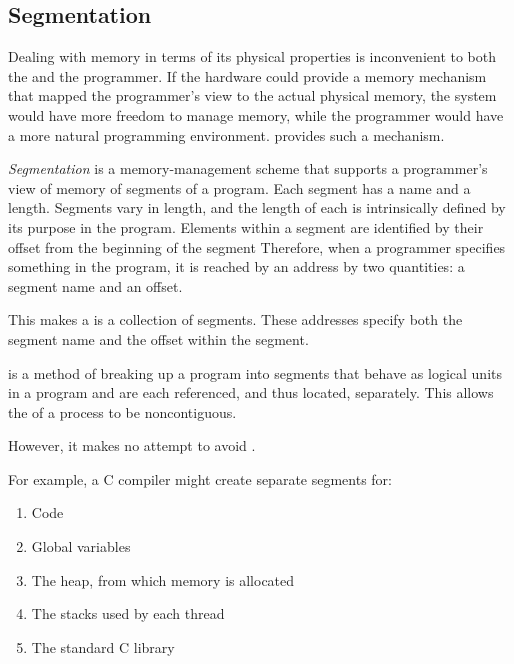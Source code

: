 \subsection{Segmentation}\label{subsec:Segmentation}
Dealing with memory in terms of its physical properties is inconvenient to both the  and the programmer.
If the hardware could provide a memory mechanism that mapped the programmer’s view to the actual physical memory, the system would have more freedom to manage memory, while the programmer would have a more natural programming environment.
 provides such a mechanism.

\begin{definition}[Segmentation]\label{def:Segmentation}
  \emph{Segmentation} is a memory-management scheme that supports a programmer's view of memory of segments of a program.
  Each segment has a name and a length.
  Segments vary in length, and the length of each is intrinsically defined by its purpose in the program.
  Elements within a segment are identified by their offset from the beginning of the segment
  Therefore, when a programmer specifies something in the program, it is reached by an address by two quantities: a segment name and an offset.

  This makes a  is a collection of segments.
  These addresses specify both the segment name and the offset within the segment.

  \begin{remark}\label{rmk:Segmentation_Memory_Locations}
     is a method of breaking up a program into segments that behave as logical units in a program and are each referenced, and thus located, separately.
    This allows the  of a process to be noncontiguous.

    However, it makes no attempt to avoid .
  \end{remark}
\end{definition}

For example, a C compiler might create separate segments for:
\begin{enumerate}[noitemsep]
\item Code
\item Global variables
\item The heap, from which memory is allocated
\item The stacks used by each thread
\item The standard C library
\end{enumerate}

